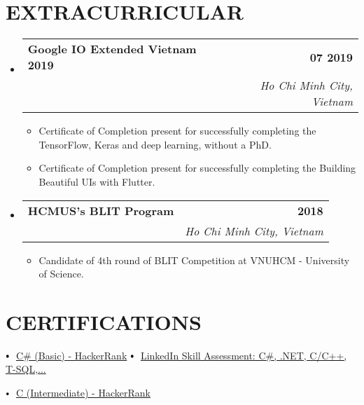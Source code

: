 \documentclass[letterpaper,11pt]{article}
\makeatletter
\newcommand{\resumeItem}[1]{
  \item\small{
    {#1 \vspace{-2pt}}
  }
}
\newcommand{\resumeSubheading}[4]{
  \vspace{-2pt}\item
    \begin{tabular*}{1.0\textwidth}[t]{l@{\extracolsep{\fill}}r}
      \textbf{\large#1} & \textbf{\small #2} \\
      \textit{\large#3} & \textit{\small #4} \\
      
    \end{tabular*}\vspace{-7pt}
}
\newcommand{\resumeSubHeadingListStart}{\begin{itemize}[leftmargin=0.0in, label={}]}
\newcommand{\resumeSubHeadingListEnd}{\end{itemize}}
\newcommand{\resumeItemListStart}{\begin{itemize}}
\newcommand{\resumeItemListEnd}{\end{itemize}\vspace{-5pt}}
\newcommand\sbullet[1][.5]{\mathbin{\vcenter{\hbox{\scalebox{#1}{$\bullet$}}}}}
\makeatother
\begin{document}
\section{EXTRACURRICULAR}
    \resumeSubHeadingListStart
        \resumeSubheading{Google IO Extended Vietnam 2019 \href{https://drive.google.com/drive/folders/1k5h6xw7oFICgEAcnXmVP1wcZdPf8Fa5k?usp=sharing}{\raisebox{-0.1\height}\faExternalLink } }{07 2019}
        {}{Ho Chi Minh City, Vietnam}
            \resumeItemListStart
                \resumeItem{\normalsize{Certificate of Completion present for successfully completing the TensorFlow, Keras and deep learning, without a PhD.}}
                \resumeItem{\normalsize{Certificate of Completion present for successfully completing the Building Beautiful UIs with Flutter.}}
            \resumeItemListEnd

        \resumeSubheading{HCMUS's BLIT Program}{2018}
        {}{Ho Chi Minh City, Vietnam}
            \resumeItemListStart
                \resumeItem{\normalsize{Candidate of 4th round of BLIT Competition at VNUHCM - University of Science.}}
            \resumeItemListEnd
    \resumeSubHeadingListEnd
 \vspace{-11pt}
 
\section{CERTIFICATIONS}

\hspace{0.15in} $\sbullet[.7] \hspace{0.1cm}$ {\href{https://www.hackerrank.com/certificates/229a5a0f646d}{C\# (Basic) - HackerRank} \href{https://www.hackerrank.com/certificates/229a5a0f646d}{\raisebox{-0.1\height}\faExternalLink }} \hspace{1.3cm}
$\sbullet[.7] \hspace{0.1cm}$ {\href{https://www.linkedin.com/in/phna-harris/details/skills/}{LinkedIn Skill Assessment: C\#, .NET, C/C++, T-SQL,...} \href{https://www.linkedin.com/in/phna-harris/details/skills/}{\raisebox{-0.1\height}\faExternalLink }}

\hspace{0.15in} $\sbullet[.7] \hspace{0.1cm}$ {\href{https://www.hackerrank.com/certificates/7cd765401419}{C (Intermediate) - HackerRank} \href{https://www.hackerrank.com/certificates/7cd765401419}{\raisebox{-0.1\height}\faExternalLink }} \hspace{0.37cm}
\end{document}
